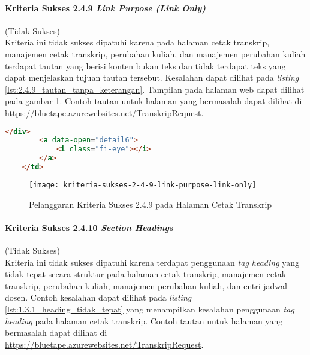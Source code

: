 \paragraph{Kriteria Sukses 2.4.9 \textit{Link Purpose (Link Only)}}
\label{par:kepatuhan_bluetape_kriteria_sukses_2.4.9}
(Tidak Sukses)\\

Kriteria ini tidak sukses dipatuhi karena pada halaman cetak transkrip, manajemen cetak transkrip, perubahan kuliah, dan manajemen perubahan kuliah terdapat tautan yang berisi konten bukan teks dan tidak terdapat teks yang dapat menjelaskan tujuan tautan tersebut. Kesalahan dapat dilihat pada \textit{listing} \ref{lst:2.4.9_tautan_tanpa_keterangan}. Tampilan pada halaman web dapat dilihat pada gambar \ref{fig:2.4.9_link_purpose_link_only}. Contoh tautan untuk halaman yang bermasalah dapat dilihat di \url{https://bluetape.azurewebsites.net/TranskripRequest}.

\begin{lstlisting}[frame=single, label={lst:2.4.9_tautan_tanpa_keterangan}, language=HTML, caption=Pelanggaran Kriteria Sukses 2.4.9 pada Halaman Cetak Transkrip]
        </div>
        <a data-open="detail6">
            <i class="fi-eye"></i>
        </a>
    </td>
\end{lstlisting}

\begin{figure}[H]
    \centering  
    \texttt{[image: kriteria-sukses-2-4-9-link-purpose-link-only]}  
    \caption[Pelanggaran Kriteria Sukses 2.4.9 pada Halaman Cetak Transkrip]{Pelanggaran Kriteria Sukses 2.4.9 pada Halaman Cetak Transkrip}
    \label{fig:2.4.9_link_purpose_link_only}  
\end{figure} 

\paragraph{Kriteria Sukses 2.4.10 \textit{Section Headings}}
\label{par:kepatuhan_bluetape_kriteria_sukses_2.4.10}
(Tidak Sukses)\\

Kriteria ini tidak sukses dipatuhi karena terdapat penggunaan \textit{tag heading} yang tidak tepat secara struktur pada halaman cetak transkrip, manajemen cetak transkrip, perubahan kuliah, manajemen perubahan kuliah, dan entri jadwal dosen. Contoh kesalahan dapat dilihat pada \textit{listing} \ref{lst:1.3.1_heading_tidak_tepat} yang menampilkan kesalahan penggunaan \textit{tag heading} pada halaman cetak transkrip. Contoh tautan untuk halaman yang bermasalah dapat dilihat di \url{https://bluetape.azurewebsites.net/TranskripRequest}.

